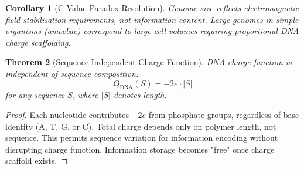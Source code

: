 \documentclass[11pt,a4paper]{article}
\newtheorem{theorem}{Theorem}[section]
\newtheorem{corollary}[theorem]{Corollary}
\theoremstyle{remark}
\begin{document}
\begin{corollary}[C-Value Paradox Resolution]
\label{cor:c_value_resolution}
Genome size reflects electromagnetic field stabilisation requirements, not information content. Large genomes in simple organisms (amoebae) correspond to large cell volumes requiring proportional DNA charge scaffolding.
\end{corollary}

\begin{theorem}[Sequence-Independent Charge Function]
\label{thm:sequence_independent}
DNA charge function is independent of sequence composition:
\begin{equation}
Q_{\text{DNA}}(S) = -2e \cdot |S|
\end{equation}
for any sequence $S$, where $|S|$ denotes length.
\end{theorem}

\begin{proof}
Each nucleotide contributes $-2e$ from phosphate groups, regardless of base identity (A, T, G, or C). Total charge depends only on polymer length, not sequence. This permits sequence variation for information encoding without disrupting charge function. Information storage becomes "free" once charge scaffold exists.
\end{proof}
\end{document}
